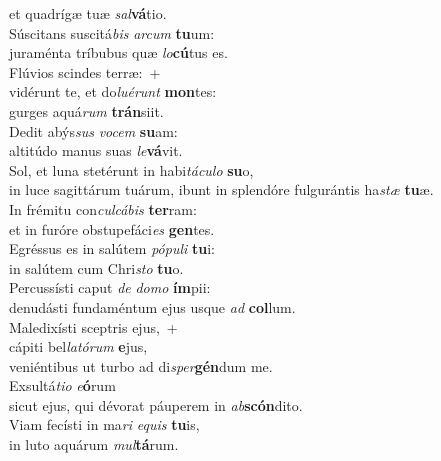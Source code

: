\oddverse et quadrígæ tuæ \textit{sal}\textbf{vá}tio.\\
\evenverse Súscitans suscitá\textit{bis} \textit{ar}\textit{cum} \textbf{tu}um:~\*\\
\evenverse juraménta tríbubus quæ \textit{lo}\textbf{cú}tus es.\\
\oddverse Flúvios scindes terræ:~+\\
\oddverse  vidérunt te, et do\textit{lu}\textit{é}\textit{runt} \textbf{mon}tes:~\*\\
\oddverse gurges aquá\textit{rum} \textbf{trán}siit.\\
\evenverse Dedit abýs\textit{sus} \textit{vo}\textit{cem} \textbf{su}am:~\*\\
\evenverse altitúdo manus suas \textit{le}\textbf{vá}vit.\\
\oddverse Sol, et luna stetérunt in habi\textit{tá}\textit{cu}\textit{lo} \textbf{su}o,~\*\\
\oddverse in luce sagittárum tuárum, ibunt in splendóre fulgurántis ha\textit{stæ} \textbf{tu}æ.\\
\evenverse In frémitu con\textit{cul}\textit{cá}\textit{bis} \textbf{ter}ram:~\*\\
\evenverse et in furóre obstupefáci\textit{es} \textbf{gen}tes.\\
\oddverse Egréssus es in salútem \textit{pó}\textit{pu}\textit{li} \textbf{tu}i:~\*\\
\oddverse in salútem cum Chri\textit{sto} \textbf{tu}o.\\
\evenverse Percussísti caput \textit{de} \textit{do}\textit{mo} \textbf{ím}pii:~\*\\
\evenverse denudásti fundaméntum ejus usque \textit{ad} \textbf{col}lum.\\
\oddverse Maledixísti sceptris ejus,~+\\
\oddverse  cápiti bel\textit{la}\textit{tó}\textit{rum} \textbf{e}jus,~\*\\
\oddverse veniéntibus ut turbo ad di\textit{sper}\textbf{gén}dum me.\\
\evenverse Exsultá\textit{ti}\textit{o} \textit{e}\textbf{ó}rum~\*\\
\evenverse sicut ejus, qui dévorat páuperem in \textit{ab}\textbf{scón}dito.\\
\oddverse Viam fecísti in ma\textit{ri} \textit{e}\textit{quis} \textbf{tu}is,~\*\\
\oddverse in luto aquárum \textit{mul}\textbf{tá}rum.\\

